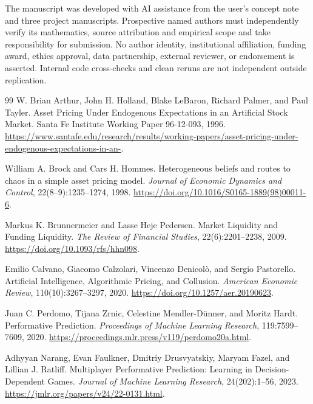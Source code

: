 \documentclass[11pt,a4paper]{article}
\theoremstyle{definition}
\theoremstyle{remark}
\begin{document}
The manuscript was developed with AI assistance from the user's concept note and three project manuscripts. Prospective named authors must independently verify its mathematics, source attribution and empirical scope and take responsibility for submission. No author identity, institutional affiliation, funding award, ethics approval, data partnership, external reviewer, or endorsement is asserted. Internal code cross-checks and clean reruns are not independent outside replication.

\begingroup
\small
\setlength{\bibsep}{2pt}
\begin{thebibliography}{99}
W. Brian Arthur, John H. Holland, Blake LeBaron, Richard Palmer, and Paul Tayler.
\newblock Asset Pricing Under Endogenous Expectations in an Artificial Stock Market.
\newblock Santa Fe Institute Working Paper 96-12-093, 1996.
\newblock \url{https://www.santafe.edu/research/results/working-papers/asset-pricing-under-endogenous-expectations-in-an-}.

William A. Brock and Cars H. Hommes.
\newblock Heterogeneous beliefs and routes to chaos in a simple asset pricing model.
\newblock \emph{Journal of Economic Dynamics and Control}, 22(8--9):1235--1274, 1998.
\newblock \url{https://doi.org/10.1016/S0165-1889(98)00011-6}.

Markus K. Brunnermeier and Lasse Heje Pedersen.
\newblock Market Liquidity and Funding Liquidity.
\newblock \emph{The Review of Financial Studies}, 22(6):2201--2238, 2009.
\newblock \url{https://doi.org/10.1093/rfs/hhn098}.

Emilio Calvano, Giacomo Calzolari, Vincenzo Denicol\`o, and Sergio Pastorello.
\newblock Artificial Intelligence, Algorithmic Pricing, and Collusion.
\newblock \emph{American Economic Review}, 110(10):3267--3297, 2020.
\newblock \url{https://doi.org/10.1257/aer.20190623}.

Juan C. Perdomo, Tijana Zrnic, Celestine Mendler-D\"unner, and Moritz Hardt.
\newblock Performative Prediction.
\newblock \emph{Proceedings of Machine Learning Research}, 119:7599--7609, 2020.
\newblock \url{https://proceedings.mlr.press/v119/perdomo20a.html}.

Adhyyan Narang, Evan Faulkner, Dmitriy Drusvyatskiy, Maryam Fazel, and Lillian J. Ratliff.
\newblock Multiplayer Performative Prediction: Learning in Decision-Dependent Games.
\newblock \emph{Journal of Machine Learning Research}, 24(202):1--56, 2023.
\newblock \url{https://jmlr.org/papers/v24/22-0131.html}.


\end{thebibliography}
\end{document}
